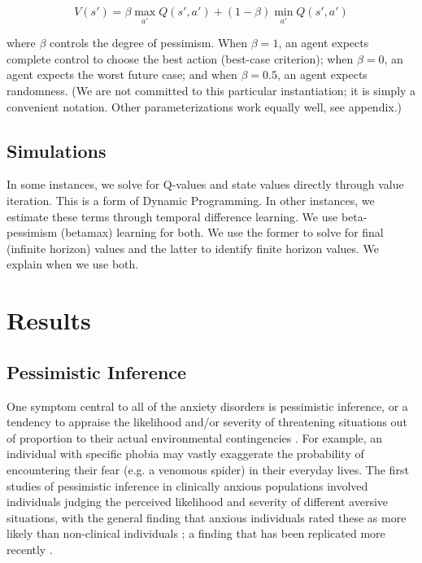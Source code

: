 \documentclass[11pt]{article} %
\begin{document}
$$ V(s') = \beta \max_{a'} Q(s',a') + (1 - \beta) \min_{a'} Q(s',a') $$

where $\beta$ controls the degree of pessimism. When $\beta = 1$, an agent expects
complete control to choose the best action (best-case criterion); when $\beta = 0$,
an agent expects the  worst future case; and when $\beta = 0.5$, an agent expects
randomness. (We are not committed to this particular instantiation; it is simply
a convenient notation. Other parameterizations work equally well, see appendix.)

\subsection{Simulations}

In some instances, we solve for Q-values and state values directly through value
iteration. This is a form of Dynamic Programming. In other instances, we estimate
these terms through temporal difference learning. We use beta-pessimism (betamax)
learning for both. We use the former to solve for final (infinite horizon) values
and the latter to identify finite horizon values. We explain when we use both.

\section{Results}

\subsection{Pessimistic Inference}

One symptom central to all of the anxiety disorders is pessimistic inference,
or a tendency to appraise the likelihood and/or severity of threatening situations
out of proportion to their actual environmental contingencies \citep{dsm5, BeckClark1997,
ClarkBeck2011}. For example, an individual with specific phobia may vastly exaggerate
the probability of encountering their fear (e.g. a venomous spider) in their
everyday lives. The first studies of pessimistic inference in clinically anxious
populations involved individuals judging the perceived likelihood and severity
of different aversive situations, with the general finding that anxious individuals
rated these as more likely than non-clinical individuals \citep{ButlerMathews1983,
ButlerMathews1987, Foa1996, MacLeod1996, MacLeod1997, Luten1997, Stober1997,
Borkovec1999}; a finding that has been replicated more recently \citep{Maner2006,
Mitte2007, Miranda2007}.
\end{document}
